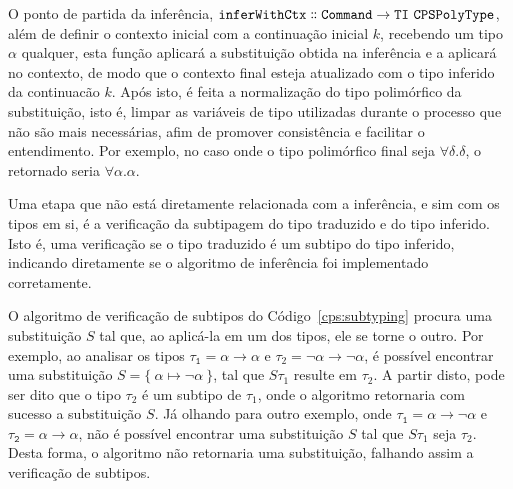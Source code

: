 O ponto de partida da inferência, $\mathtt{inferWithCtx \dblcolon Command \to TI\ CPSPolyType}$, além de definir o contexto inicial com a continuação inicial $k$, recebendo um tipo $\alpha$ qualquer, esta função aplicará a substituição obtida na inferência e a aplicará no contexto, de modo que o contexto final esteja atualizado com o tipo inferido da continuacão $k$.
Após isto, é feita a normalização do tipo polimórfico da substituição, isto é, limpar as variáveis de tipo utilizadas durante o processo que não são mais necessárias, afim de promover consistência e facilitar o entendimento.
Por exemplo, no caso onde o tipo polimórfico final seja $\forall\delta.\delta$, o retornado seria $\forall\alpha.\alpha$.

Uma etapa que não está diretamente relacionada com a inferência, e sim com os tipos em si, é a verificação da subtipagem do tipo traduzido e do tipo inferido.
Isto é, uma verificação se o tipo traduzido é um subtipo do tipo inferido, indicando diretamente se o algoritmo de inferência foi implementado corretamente.

O algoritmo de verificação de subtipos do Código~\ref{cps:subtyping} procura uma substituição $S$ tal que, ao aplicá-la em um dos tipos, ele se torne o outro.
Por exemplo, ao analisar os tipos $\mathtt{\tau_1 = \alpha \to \alpha}$ e $\tau_2 = \neg\alpha \to \neg\alpha$, é possível encontrar uma substituição $S = \{\ \alpha \mapsto \neg\alpha \ \}$, tal que $S\tau_1$ resulte em $\tau_2$.
A partir disto, pode ser dito que o tipo $\tau_2$ é um subtipo de $\tau_1$, onde o algoritmo retornaria com sucesso a substituição $S$.
Já olhando para outro exemplo, onde $\mathtt{\tau_1 = \alpha \to \neg\alpha}$ e $\mathtt{\tau_2 = \alpha \to \alpha}$, não é possível encontrar uma substituição $S$ tal que $S\tau_1$ seja $\tau_2$.
Desta forma, o algoritmo não retornaria uma substituição, falhando assim a verificação de subtipos.
